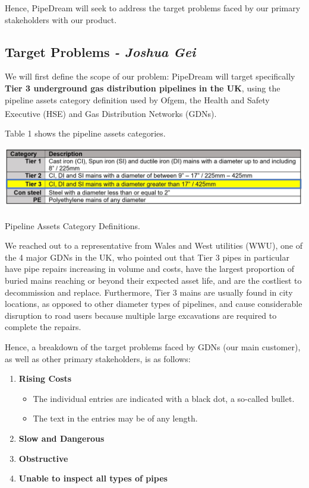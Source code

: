 \documentclass[11pt]{article}		%
\newcommand{\supercite}[1]{\textsuperscript{\cite{#1}}}		%
\begin{document}
Hence, PipeDream will seek to address the target problems faced by our primary stakeholders with our product. 

	\subsection{Target Problems \textit{- Joshua Gei}}
We will first define the scope of our problem: PipeDream will target specifically \textbf{Tier 3 underground gas distribution pipelines in the UK}, using the pipeline assets category definition used by Ofgem, the Health and Safety Executive (HSE) and Gas Distribution Networks (GDNs)\supercite{pct2020states}. 

Table 1 shows the pipeline assets categories. 

    \begin{table}[h]
    \centering
  \includegraphics[width=\textwidth]{GasTiers}
  \caption{Pipeline Assets Category Definitions\supercite{pct2020states}.}
  \label{GasTiers}
    \end{table}
We reached out to a representative from Wales and West utilities (WWU), one of the 4 major GDNs in the UK, who pointed out that Tier 3 pipes in particular have pipe repairs increasing in volume and costs, have the largest proportion of buried mains reaching or beyond their expected asset life, and are the costliest to decommission and replace. Furthermore, Tier 3 mains are usually found in city locations, as opposed to other diameter types of pipelines, and cause considerable disruption to road users because multiple large excavations are required to complete the repairs.

Hence, a breakdown of the target problems faced by GDNs (our main customer), as well as other primary stakeholders, is as follows: 

\begin{enumerate}
   \item \textbf{Rising Costs}
   \begin{itemize}
     \item The individual entries are indicated with a black dot, a so-called bullet.
     \item The text in the entries may be of any length.
   \end{itemize}
   \item \textbf{Slow and Dangerous}
   \item \textbf{Obstructive}
   \item \textbf{Unable to inspect all types of pipes}
\end{enumerate}
\end{document}
